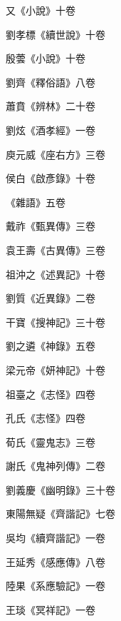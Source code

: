 \begin{pinyinscope}
 又《小說》十卷



 劉孝標《續世說》十卷



 殷蕓《小說》十卷



 劉齊《釋俗語》八卷



 蕭賁《辨林》二十卷



 劉炫《酒孝經》一卷



 庾元威《座右方》三卷



 侯白《啟彥錄》十卷



 《雜語》五卷



 戴祚《甄異傳》三卷



 袁王壽《古異傳》三卷



 祖沖之《述異記》十卷



 劉質《近異錄》二卷



 干寶《搜神記》三十卷



 劉之遴《神錄》五卷



 梁元帝《妍神記》十卷



 祖臺之《志怪》四卷



 孔氏《志怪》四卷



 荀氏《靈鬼志》三卷



 謝氏《鬼神列傳》二卷



 劉義慶《幽明錄》三十卷



 東陽無疑《齊諧記》七卷



 吳均《續齊諧記》一卷



 王延秀《感應傳》八卷



 陸果《系應驗記》一卷



 王琰《冥祥記》一卷




\end{pinyinscope}
